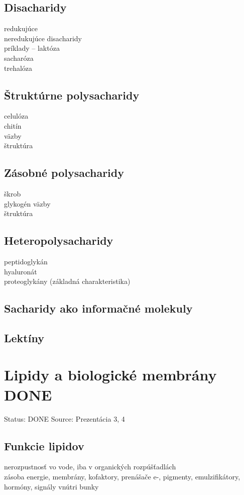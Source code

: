 \subsection*{Disacharidy}
\tab redukujúce\\
\tab neredukujúce disacharidy\\
\tab príklady -- laktóza\\
\tab sacharóza\\
\tab trehalóza\\
\subsection*{Štruktúrne polysacharidy}
\tab celulóza\\
\tab chitín\\
\tab \tab väzby\\
\tab \tab štruktúra\\
\subsection*{Zásobné polysacharidy}
\tab škrob\\
\tab glykogén
\tab \tab väzby\\
\tab \tab štruktúra\\
\subsection*{Heteropolysacharidy}
\tab peptidoglykán\\
\tab hyaluronát\\
\tab proteoglykány (základná charakteristika)\\
\subsection*{Sacharidy ako informačné molekuly}
\subsection*{Lektíny}

\section{Lipidy a biologické membrány DONE}

Status: DONE
Source: Prezentácia 3, 4

\subsection*{Funkcie lipidov}
nerozpustnosť vo vode, iba v organických rozpúšťadlách\\
zásoba energie, membrány, kofaktory, prenášače e-, pigmenty, emulzifikátory, hormóny, signály vnútri bunky\\
